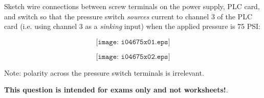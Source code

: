 

Sketch wire connections between screw terminals on the power supply, PLC card, and switch so that the pressure switch {\it sources} current to channel 3 of the PLC card (i.e. using channel 3 as a {\it sinking} input) when the applied pressure is 75 PSI:

$$\texttt{[image: i04675x01.eps]}$$







$$\texttt{[image: i04675x02.eps]}$$

Note: polarity across the pressure switch terminals is irrelevant.







{\bf This question is intended for exams only and not worksheets!}.



